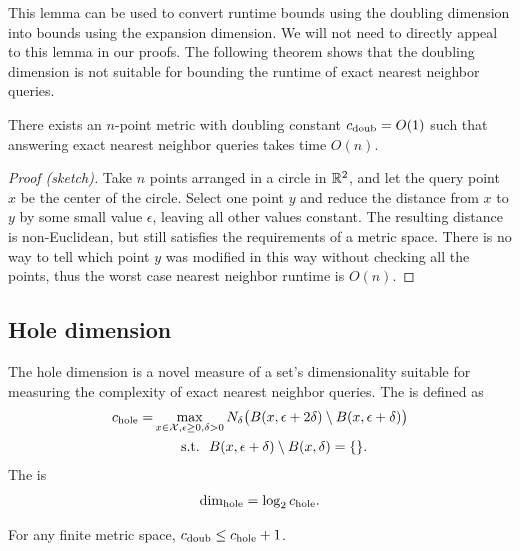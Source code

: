 \documentclass[thesis.tex]{subfiles}
\newcommand{\set}[1]{\mathcal {#1}}
\newcommand{\holedim}{\text{dim}_{\textnormal{hole}}}
\newcommand{\cdoub}{c_\textnormal{doub}}
\newcommand{\chole}{c_\textnormal{hole}}
\begin{document}
\noindent
This lemma can be used to convert runtime bounds using the doubling dimension into bounds using the expansion dimension.
We will not need to directly appeal to this lemma in our proofs.
The following theorem shows that the doubling dimension is not suitable for bounding the runtime of exact nearest neighbor queries.

\begin{theorem}
    \label{theorem:exactdoubling}
    There exists an $n$-point metric with doubling constant $\cdoub=O(1)$ such that answering exact nearest neighbor queries takes time $O(n)$.
\end{theorem}

\begin{proof}[Proof (sketch)]
    Take $n$ points arranged in a circle in $\mathbb R^2$, and let the query point $x$ be the center of the circle. 
        Select one point $y$ and reduce the distance from $x$ to $y$ by some small value $\epsilon$, leaving all other values constant.
        The resulting distance is non-Euclidean, but still satisfies the requirements of a metric space.
        There is no way to tell which point $y$ was modified in this way without checking all the points,
        thus the worst case nearest neighbor runtime is $O(n)$.
\end{proof}


\subsection{Hole dimension}

The hole dimension is a novel measure of a set's dimensionality suitable for measuring the complexity of exact nearest neighbor queries.
The  is defined as
\begin{align}
    \label{eq:chole}
    \chole
    = 
    &\max_{x\in\set X, \epsilon \ge 0, \delta > 0} 
    N_\delta\big( B(x,\epsilon+2\delta) \setminus B(x,\epsilon+\delta) \big)
    \\
    &
    ~~~~~~\text{s.t.}
    ~~
    B(x,\epsilon+\delta) \setminus B(x,\delta) = \{\}
    .
\end{align}
The  is
\begin{align}
    \holedim = \log_2 \chole
    .
\end{align}

\begin{lemma}
    \label{lemma:chole}
    For any finite metric space,
        $\cdoub \le \chole + 1$.
\end{lemma}
\end{document}
